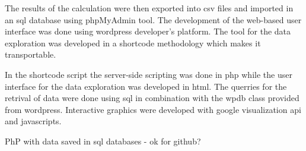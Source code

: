 The results of the calculation were then exported into csv files and imported
in an sql database using phpMyAdmin tool. The development of the web-based user interface was done using wordpress developer's platform. The tool for the data exploration was developed in a shortcode methodology
which makes it transportable.

In the shortcode script the server-side scripting was done in php while the user interface for the data exploration was developed in html. The querries for the retrival of data were done using sql in combination with the wpdb class provided from wordpress. Interactive graphics were developed with google visualization api and javascripts.

PhP with data saved in sql databases - ok for github?